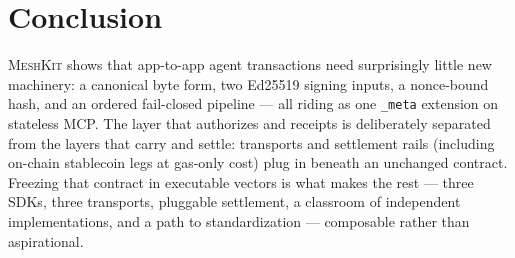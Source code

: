 \documentclass[10pt,twocolumn]{article}
\newcommand{\meshkit}{\textsc{MeshKit}}
\newcommand{\field}[1]{\texttt{#1}}
\begin{document}
\section{Conclusion}

\meshkit{} shows that app-to-app agent transactions need surprisingly
little new machinery: a canonical byte form, two Ed25519 signing inputs,
a nonce-bound hash, and an ordered fail-closed pipeline --- all riding as
one \field{\_meta} extension on stateless MCP. The layer that authorizes
and receipts is deliberately separated from the layers that carry and
settle: transports and settlement rails (including on-chain stablecoin
legs at gas-only cost) plug in beneath an unchanged contract. Freezing
that contract in executable vectors is what makes the rest --- three SDKs,
three transports, pluggable settlement, a classroom of independent
implementations, and a path to standardization --- composable rather than
aspirational.
\end{document}
